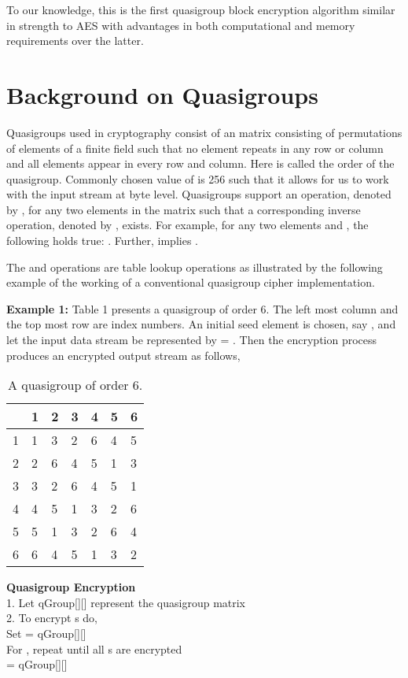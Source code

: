 \documentclass[conference]{IEEEtran}
\begin{document}
To our knowledge, this is the first quasigroup block encryption algorithm similar in strength to AES with advantages in both computational and memory requirements over the latter.

\section{Background on Quasigroups}
Quasigroups used in cryptography consist of an  matrix consisting of permutations of elements of a finite field  such that no element repeats in any row or column and all elements appear in every row and column. Here  is called the order of the quasigroup. Commonly chosen value of  is 256 such that it allows for us to work with the input stream at byte level. Quasigroups support an operation, denoted by , for any two elements in the matrix such that a corresponding inverse operation, denoted by , exists. For example, for any two elements  and , the following holds true: . Further,  implies .

The  and  operations are table lookup operations as illustrated by the following example of the working of a conventional quasigroup cipher implementation.

\textbf{Example 1:} Table 1 presents a quasigroup of order 6. The left most column and the top most row are index numbers. An initial seed element is chosen, say , and let the input data stream be represented by  = . Then the encryption process produces an encrypted output stream  as follows,

\begin{table}
\centering\label{tableQG}
\begin{tabular}{|r|l|l|l|l|l|l|}
\hline
& 1&  2&  3&  4&  5&  6\\ \hline
1& 1&  3&  2&  6&  4&  5\\ \hline
2& 2&  6&  4&  5&  1&  3\\ \hline
3& 3&  2&  6&  4&  5&  1\\ \hline
4& 4&  5&  1&  3&  2&  6\\ \hline
5& 5&  1&  3&  2&  6&  4\\ \hline
6& 6&  4&  5&  1&  3&  2\\ \hline
\end{tabular}
\caption{A quasigroup of order 6.}
\end{table}

\noindent\textbf{Quasigroup Encryption}\\
  \hspace*{1em} 1. Let qGroup[][] represent the quasigroup matrix\\
  \hspace*{1em} 2. To encrypt s do,\\
  \hspace*{3em} Set  = qGroup[][]\\
  \hspace*{3em} For , repeat until all s are encrypted\\
  \hspace*{4em}  = qGroup[][]
\end{document}
